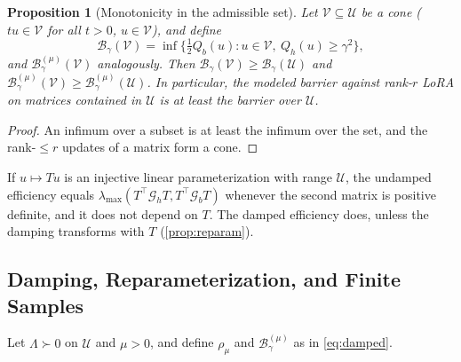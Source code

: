 \documentclass[11pt]{article}
\newtheorem{proposition}{Proposition}
\newcommand{\Gh}{\mathcal{G}_{h}}
\newcommand{\Gb}{\mathcal{G}_{b}}
\newcommand{\Barrier}{\mathcal{B}}
\newcommand{\U}{\mathcal{U}}
\newcommand{\rhoreg}{\rho_{\mu}}
\begin{document}
\begin{proposition}[Monotonicity in the admissible set]
\label{prop:monotone}
Let $\mathcal V\subseteq\U$ be a cone ($tu\in\mathcal V$ for all $t>0$, $u\in\mathcal V$), and define
\begin{equation*}
\Barrier_\gamma(\mathcal V)=\inf\bigl\{\tfrac12Q_b(u):u\in\mathcal V,\ Q_h(u)\ge\gamma^2\bigr\},
\end{equation*}
and $\Barrier^{(\mu)}_\gamma(\mathcal V)$ analogously. Then $\Barrier_\gamma(\mathcal V)\ge\Barrier_\gamma(\U)$ and $\Barrier^{(\mu)}_\gamma(\mathcal V)\ge\Barrier^{(\mu)}_\gamma(\U)$. In particular, the modeled barrier against rank-$r$ LoRA on matrices contained in $\U$ is at least the barrier over $\U$.
\end{proposition}
\begin{proof}
An infimum over a subset is at least the infimum over the set, and the rank-$\le r$ updates of a matrix form a cone.
\end{proof}

If $u\mapsto Tu$ is an injective linear parameterization with range $\U$, the undamped efficiency equals $\lambda_{\max}(T^\top\Gh T,T^\top\Gb T)$ whenever the second matrix is positive definite, and it does not depend on $T$. The damped efficiency does, unless the damping transforms with $T$ (\cref{prop:reparam}).

\subsection{Damping, Reparameterization, and Finite Samples}
\label{app:damping}

Let $\Lambda\succ0$ on $\U$ and $\mu>0$, and define $\rhoreg$ and $\Barrier^{(\mu)}_\gamma$ as in \cref{eq:damped}.
\end{document}
